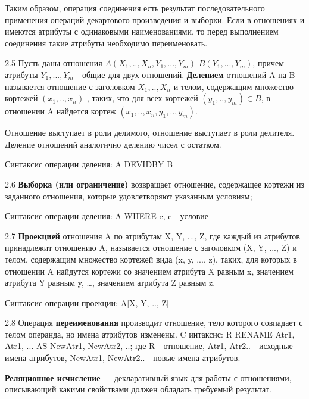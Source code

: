 Таким образом, операция соединения есть результат последовательного применения операций декартового произведения и выборки. Если в отношениях  и  имеются атрибуты с одинаковыми наименованиями, то перед выполнением соединения такие атрибуты необходимо переименовать.

2.5 Пусть даны отношения $A(X_1, .., X_n, Y_1, ..., Y_m)$  $B(Y_1, ..., Y_m)$, причем атрибуты $Y_1, ..., Y_m$ - общие для двух отношений. \textbf{Делением} отношений A на B называется отношение с заголовком  $X_1, .., X_n$ и телом, содержащим множество кортежей $(x_1, .., x_n)$ , таких, что для всех кортежей $(y_1, .., y_m) \in B$, в отношении A найдется кортеж $(x_1, .., x_n, y_1, .., y_m)$.

Отношение  выступает в роли делимого, отношение  выступает в роли делителя. Деление отношений аналогично делению чисел с остатком.

Синтаксис операции деления: A DEVIDBY B

2.6 \textbf{Выборка (или ограничение)} возвращает отношение, содержащее кортежи из заданного отношения, которые удовлетворяют указанным условиям;

Синтаксис операции деления: A WHERE c, c - условие 

2.7 \textbf{Проекцией} отношения A по атрибутам X, Y, ..., Z, где каждый из атрибутов принадлежит отношению A, называется отношение с заголовком (X, Y, ..., Z)  и телом, содержащим множество кортежей вида (x, y, ..., z), таких, для которых в отношении A найдутся кортежи со значением атрибута X равным x, значением атрибута Y равным y, …, значением атрибута Z равным z. 

Синтаксис операции проекции: A[X, Y, .., Z]

2.8 Операция \textbf{переименования} производит отношение, тело которого совпадает с телом операнда, но имена атрибутов изменены. 
C
интаксис: R RENAME Atr1, Atr1, ... AS NewAtr1, NewAtr2, ..; где R - отношение, Atr1, Atr2.. - исходные имена атрибутов, NewAtr1, NewAtr2.. - новые имена атрибутов.

\textbf{Реляционное исчисление} — декларативный язык для работы с отношениями, описывающий какими свойствами должен обладать требуемый результат.